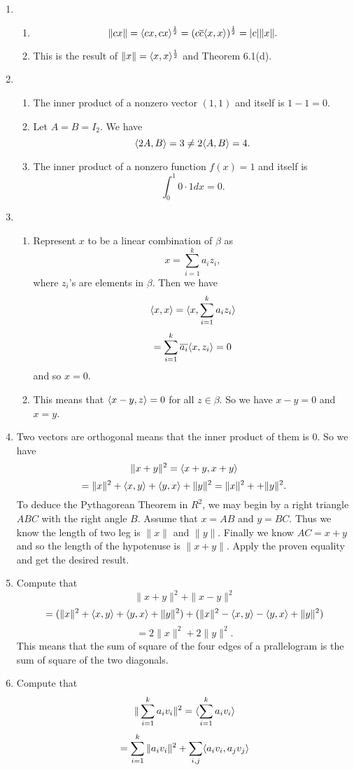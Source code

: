 \begin{enumerate}
\begin{enumerate}
\end{enumerate}
\item \begin{enumerate}
\item \[\|cx\|=\langle cx,cx\rangle ^{\frac{1}{2}}=(c\overline{c}\langle x,x\rangle)^{\frac{1}{2}}=|c|\|x\|.\]
\item This is the result of $\|x\|=\langle x,x\rangle^{\frac{1}{2}}$ and Theorem 6.1(d).
\end{enumerate}
\item \begin{enumerate}
\item The inner product of a nonzero vector $(1,1)$ and itself is $1-1=0$.
\item Let $A=B=I_2$. We have 
\[\langle 2A,B\rangle=3\neq 2\langle A,B\rangle =4.\]
\item The inner product of a nonzero function $f(x)=1$ and itself is 
\[\int_0^1{0\cdot 1dx}=0.\]
\end{enumerate}
\item \begin{enumerate}
\item Represent $x$ to be a linear combination of $\beta$ as 
\[x=\sum_{i=1}^k{a_iz_i},\]
where $z_i$'s are elements in $\beta$. Then we have 
\[\langle x,x\rangle =\langle x,\sum_{i=1}^k{a_iz_i}\rangle \]
\[=\sum_{i=1}^k{\overline{a_i}\langle x,z_i\rangle}=0\]
and so $x=0$.
\item This means that $\langle x-y,z\rangle =0$ for all $z\in \beta$. So we have $x-y=0$ and $x=y$.
\end{enumerate}
\item Two vectors are orthogonal means that the inner product of them is $0$. So we have 
\[\|x+y\|^2=\langle x+y,x+y\rangle \]
\[=\|x\|^2+\langle x,y\rangle +\langle y,x\rangle +\|y\|^2=\|x\|^2+ +\|y\|^2.\]
To deduce the Pythagorean Theorem in $R^2$, we may begin by a right triangle $ABC$ with the right angle $B$. Assume that $x=AB$ and $y=BC$. Thus we know the length of two leg is $\|x\|$ and $\|y\|$. Finally we know $AC=x+y$ and so the length of the hypotenuse is $\|x+y\|$. Apply the proven equality and get the desired result.
\item Compute that 
\[\|x+y\|^2+\|x-y\|^2\]
\[=(\|x\|^2+\langle x,y\rangle +\langle y,x\rangle +\|y\|^2)+(\|x\|^2-\langle x,y\rangle -\langle y,x\rangle +\|y\|^2)\]
\[=2\|x\|^2+2\|y\|^2.\]
This means that the sum of square of the four edges of a prallelogram is the sum of square of the two diagonals.
\item Compute that 
\[\|\sum_{i=1}^k{a_iv_i}\|^2=\langle \sum_{i=1}^k{a_iv_i}\rangle \]
\[=\sum_{i=1}^k{\|a_iv_i\|^2}+\sum_{i,j}\langle a_iv_i,a_jv_j\rangle \]

\end{enumerate}

